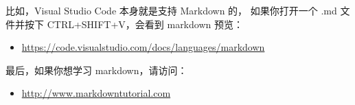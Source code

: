 比如，Visual Studio Code 本身就是支持 Markdown 的，
如果你打开一个 .md 文件并按下 CTRL+SHIFT+V，会看到 markdown 预览：

\begin{itemize}
  \item \url{https://code.visualstudio.com/docs/languages/markdown}
\end{itemize}


最后，如果你想学习 markdown，请访问：

\begin{itemize}
  \item \url{http://www.markdowntutorial.com}
\end{itemize}
